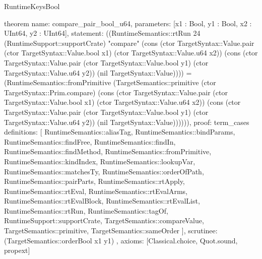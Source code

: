 \begin{lexlean}{RuntimeKeysBool}
\begin{semanticmodule}
theorem{
  name: compare_pair_bool_u64,
  parameters: [x1 : Bool, y1 : Bool, x2 : UInt64, y2 : UInt64],
  statement: ((RuntimeSemantics::rtRun 24 (RuntimeSupport::supportCrate) "compare" (cons (ctor TargetSyntax::Value.pair (ctor TargetSyntax::Value.bool x1) (ctor TargetSyntax::Value.u64 x2)) (cons (ctor TargetSyntax::Value.pair (ctor TargetSyntax::Value.bool y1) (ctor TargetSyntax::Value.u64 y2)) (nil TargetSyntax::Value)))) = (RuntimeSemantics::fromPrimitive (TargetSemantics::primitive (ctor TargetSyntax::Prim.compare) (cons (ctor TargetSyntax::Value.pair (ctor TargetSyntax::Value.bool x1) (ctor TargetSyntax::Value.u64 x2)) (cons (ctor TargetSyntax::Value.pair (ctor TargetSyntax::Value.bool y1) (ctor TargetSyntax::Value.u64 y2)) (nil TargetSyntax::Value)))))),
  proof: term_cases{
    definitions: [
      RuntimeSemantics::aliasTag,
      RuntimeSemantics::bindParams,
      RuntimeSemantics::findFree,
      RuntimeSemantics::findIn,
      RuntimeSemantics::findMethod,
      RuntimeSemantics::fromPrimitive,
      RuntimeSemantics::kindIndex,
      RuntimeSemantics::lookupVar,
      RuntimeSemantics::matchesTy,
      RuntimeSemantics::orderOfPath,
      RuntimeSemantics::pairParts,
      RuntimeSemantics::rtApply,
      RuntimeSemantics::rtEval,
      RuntimeSemantics::rtEvalArms,
      RuntimeSemantics::rtEvalBlock,
      RuntimeSemantics::rtEvalList,
      RuntimeSemantics::rtRun,
      RuntimeSemantics::tagOf,
      RuntimeSupport::supportCrate,
      TargetSemantics::compareValue,
      TargetSemantics::primitive,
      TargetSemantics::sameOrder
    ],
    scrutinee: (TargetSemantics::orderBool x1 y1)
  },
  axioms: [Classical.choice, Quot.sound, propext]
}


\end{semanticmodule}
\end{lexlean}
